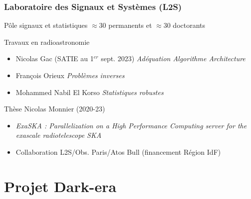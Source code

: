 \documentclass[usenames,dvipsnames]{beamer}
\begin{document}
\begin{frame}
  \frametitle{Laboratoire des Signaux et Systèmes (L2S)}
  \vfill %
  \vfill
  \begin{block}{Pôle signaux et statistiques}
   \(\approx 30\) permanents et \(\approx30\) doctorants
  \end{block}
  \vfill
  \begin{block}{Travaux en radioastronomie}
    \begin{itemize}
    \item Nicolas Gac \scriptsize{(SATIE au 1$^{er}$ sept. 2023)} \hfill \small{\textit{Adéquation Algorithme Architecture}}
    \item \normalsize{François Orieux} \hfill \small{\textit{Problèmes inverses}}
    \item \normalsize{Mohammed Nabil El Korso} \hfill \small{\textit{Statistiques robustes}}
    \end{itemize}
  \end{block}
  \vfill
  \begin{block}{Thèse Nicolas Monnier (2020-23)}
    \begin{itemize}
        \item \textit{ExaSKA : Parallelization on a High Performance Computing server for the exascale
    radiotelescope SKA}
    \item Collaboration L2S/Obs. Paris/Atos Bull (financement Région IdF)
    \end{itemize}
  \end{block}
\end{frame}

\section{Projet Dark-era}
\end{document}
